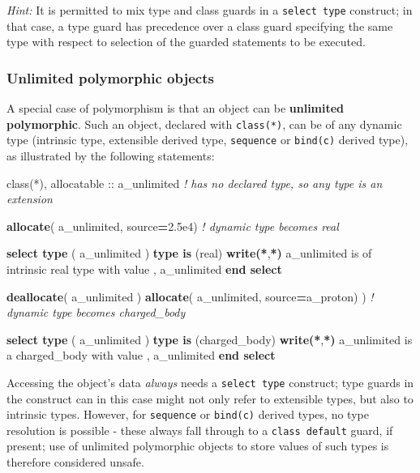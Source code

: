 \documentclass[
  paper=a4,
  ,captions=tableheading
]{scrartcl}
\newenvironment{Shaded}{\begin{snugshade}}{\end{snugshade}}
\newcommand{\CommentTok}[1]{\textcolor[rgb]{0.56,0.35,0.01}{\textit{#1}}}
\newcommand{\DataTypeTok}[1]{\textcolor[rgb]{0.13,0.29,0.53}{#1}}
\newcommand{\FloatTok}[1]{\textcolor[rgb]{0.00,0.00,0.81}{#1}}
\newcommand{\FunctionTok}[1]{\textcolor[rgb]{0.13,0.29,0.53}{\textbf{#1}}}
\newcommand{\KeywordTok}[1]{\textcolor[rgb]{0.13,0.29,0.53}{\textbf{#1}}}
\newcommand{\NormalTok}[1]{#1}
\newcommand{\StringTok}[1]{\textcolor[rgb]{0.31,0.60,0.02}{#1}}
\begin{document}
\emph{Hint:} It is permitted to mix type and class guards in a
\texttt{select\ type} construct; in that case, a type guard has
precedence over a class guard specifying the same type with respect to
selection of the guarded statements to be executed.

\subsubsection{Unlimited polymorphic
objects}\label{unlimited-polymorphic-objects}

A special case of polymorphism is that an object can be
\textbf{unlimited polymorphic}. Such an object, declared with
\texttt{class(*)}, can be of any dynamic type (intrinsic type,
extensible derived type, \texttt{sequence} or \texttt{bind(c)} derived
type), as illustrated by the following statements:

\begin{Shaded}
\begin{Highlighting}[]
\DataTypeTok{class(*)}\NormalTok{, }\DataTypeTok{allocatable} \DataTypeTok{::}\NormalTok{ a\_unlimited  }\CommentTok{! has no declared type, so any type is an extension}

\KeywordTok{allocate}\NormalTok{( a\_unlimited, source}\KeywordTok{=}\FloatTok{2.5e4}\NormalTok{)  }\CommentTok{! dynamic type becomes real}

\KeywordTok{select type}\NormalTok{ ( a\_unlimited )}
\KeywordTok{type is}\NormalTok{ (}\DataTypeTok{real}\NormalTok{)}
  \FunctionTok{write(*}\NormalTok{,}\FunctionTok{*)} \StringTok{\textquotesingle{}a\_unlimited is of intrinsic real type with value \textquotesingle{}}\NormalTok{, a\_unlimited}
\KeywordTok{end select}

\KeywordTok{deallocate}\NormalTok{( a\_unlimited )}
\KeywordTok{allocate}\NormalTok{( a\_unlimited, source}\KeywordTok{=}\NormalTok{a\_proton) )  }\CommentTok{! dynamic type becomes charged\_body}

\KeywordTok{select type}\NormalTok{ ( a\_unlimited )}
\KeywordTok{type is}\NormalTok{ (charged\_body)}
  \FunctionTok{write(*}\NormalTok{,}\FunctionTok{*)} \StringTok{\textquotesingle{}a\_unlimited is a charged\_body with value \textquotesingle{}}\NormalTok{, a\_unlimited}
\KeywordTok{end select}
\end{Highlighting}
\end{Shaded}

Accessing the object's data \emph{always} needs a \texttt{select\ type}
construct; type guards in the construct can in this case might not only
refer to extensible types, but also to intrinsic types. However, for
\texttt{sequence} or \texttt{bind(c)} derived types, no type resolution
is possible - these always fall through to a \texttt{class\ default}
guard, if present; use of unlimited polymorphic objects to store values
of such types is therefore considered unsafe.
\end{document}
